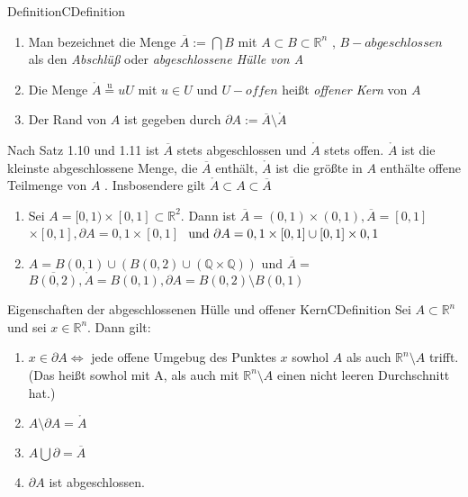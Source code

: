 \documentclass[11.5 pt, a4paper]{memoir}
\begin{document}
\begin{ibox}{Definition}{CDefinition}
    \begin{enumerate}[label=\alph*)]
        \item Man bezeichnet die Menge $ \overline{A}:= \bigcap B $ mit $ A \subset B \subset \mathbb{R}^n$ , $ B-abgeschlossen $ als den
            \textit{Abschlüß} oder \textit{abgeschlossene Hülle von A}
        \item Die Menge $ \mathring{A} \stackrel{\text{u}}{=} uU $ mit $ u \in U$ und $ U-offen $ heißt \textit{offener Kern} von $ A $
        \item Der Rand von $ A $ ist gegeben durch $ \partial A := \overline{A} \setminus \mathring{A} $ 
    \end{enumerate}
\end{ibox}

Nach Satz 1.10 und 1.11 ist $ \overline{A} $ stets abgeschlossen und $ \mathring{A} $ stets offen. $ \mathring{A} $ ist die kleinste
abgeschlossene Menge, die $ \overline{A} $ enthält, $ \mathring{A} $ ist die größte in $ A $ enthälte offene Teilmenge von $ A $ .
Insbosendere gilt $ \mathring{A} \subset A \subset \overline{A} $ 

\begin{enumerate}[label=\alph*)]
    \item Sei $ A = [0,1) \times [0,1] \subset \mathbb{R}^{2}$. Dann ist $ \overline{A} = (0,1) \times (0,1), \overline{A} = [0,1]$
       $ \times [0,1], \partial A = {0,1} \times [0,1]$
       $  \\ \text{ und } \partial A = {0,1} \times [0,1] \cup [0,1] \times {0,1}$  
    \item $ A = B(0,1) \cup \left( B(0,2) \cup \left( \mathbb{Q} \times \mathbb{Q} \right)  \right) \text{ und } \overline{A} =$
        $\overline{B(0,2)}, \mathring{A} = B(0,1), \partial A = B(0,2) \setminus B(0,1)$
\end{enumerate}
\begin{ibox}{Eigenschaften der abgeschlossenen Hülle und offener Kern}{CDefinition}
    \newline
    Sei $ A \subset \mathbb{R}^n $ und sei $ x \in \mathbb{R}^n $. Dann gilt:
    \begin{enumerate}[label=\alph*)]
        \item $ x \in \partial A \iff $ jede offene Umgebug des Punktes $ x $ sowhol $ A $ als auch $ \mathbb{R}^n \setminus A $ trifft.
            (Das heißt sowhol mit A, als auch mit $ \mathbb{R}^n \setminus A $ einen nicht leeren Durchschnitt hat.)
        \item $ A \setminus \partial A = \mathring{A}$
        \item $ A \bigcup \partial = \overline{A} $ 
        \item $ \partial A $ ist abgeschlossen.
    \end{enumerate}
\end{ibox}
\end{document}
